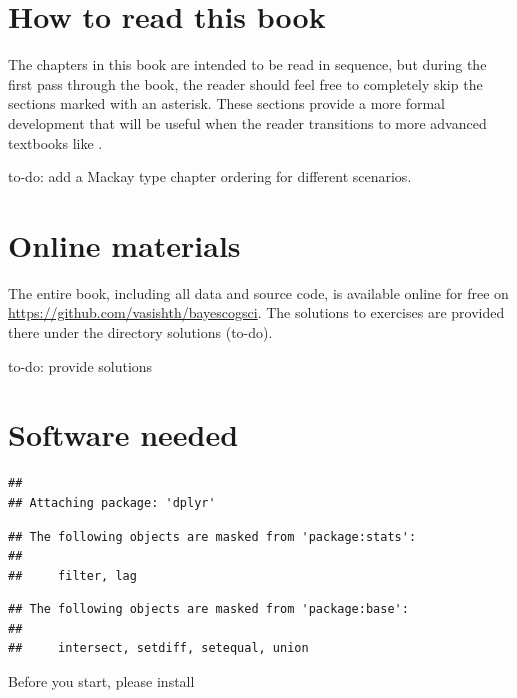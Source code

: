 \documentclass[12pt,]{krantz}
\theoremstyle{definition}
\theoremstyle{definition}
\theoremstyle{definition}
\theoremstyle{remark}
\let\BeginKnitrBlock\begin \let\EndKnitrBlock\end
\begin{document}
\hypertarget{how-to-read-this-book}{%
\section{How to read this book}\label{how-to-read-this-book}}

The chapters in this book are intended to be read in sequence, but during the first pass through the book, the reader should feel free to completely skip the sections marked with an asterisk. These sections provide a more formal development that will be useful when the reader transitions to more advanced textbooks like \citet{Gelman14}.

\BeginKnitrBlock{rmdnote}
to-do: add a Mackay type chapter ordering for different scenarios.
\EndKnitrBlock{rmdnote}

\hypertarget{online-materials}{%
\section{Online materials}\label{online-materials}}

The entire book, including all data and source code, is available online for free on \url{https://github.com/vasishth/bayescogsci}. The solutions to exercises are provided there under the directory solutions (to-do).

\BeginKnitrBlock{rmdnote}
to-do: provide solutions
\EndKnitrBlock{rmdnote}

\hypertarget{software-needed}{%
\section{Software needed}\label{software-needed}}

\begin{verbatim}
## 
## Attaching package: 'dplyr'
\end{verbatim}

\begin{verbatim}
## The following objects are masked from 'package:stats':
## 
##     filter, lag
\end{verbatim}

\begin{verbatim}
## The following objects are masked from 'package:base':
## 
##     intersect, setdiff, setequal, union
\end{verbatim}

Before you start, please install
\end{document}
